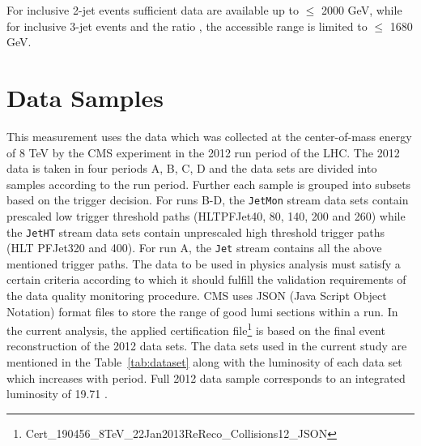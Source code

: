 For inclusive 2-jet events sufficient data are available up to \httwo $\leq$ 2000 GeV, while for inclusive 3-jet events and the ratio \rations, the accessible range is limited to \httwo $\leq$ 1680 GeV.

\section{Data Samples}
This measurement uses the data which was collected at the center-of-mass energy of 8 TeV by the CMS experiment in the 2012 run period of the LHC. The 2012 data is taken in four periods A, B, C, D and the data sets are divided into samples according to the run period. Further each sample is grouped into subsets based on the trigger decision. For runs B-D, the \texttt{JetMon} stream data sets contain prescaled low trigger threshold paths (HLTPFJet40, 80, 140, 200 and 260) while the \texttt{JetHT} stream data sets contain unprescaled high threshold trigger paths (HLT PFJet320 and 400). For run A, the \texttt{Jet} stream contains all the above mentioned trigger paths. The data to be used in physics analysis must satisfy a certain criteria according to which it should fulfill the validation requirements of the data quality monitoring procedure. CMS uses JSON (Java Script Object Notation) format files to store the range of good lumi sections within a run. In the current analysis, the applied certification file\footnote{Cert\_190456\_8TeV\_22Jan2013ReReco\_Collisions12\_JSON} is based on the final event reconstruction of the 2012 data sets. The data sets used in the current study are mentioned in the Table~\ref{tab:dataset} along with the luminosity of each data set which increases with period. Full 2012 data sample corresponds to an integrated luminosity of 19.71 \fbinv. 

